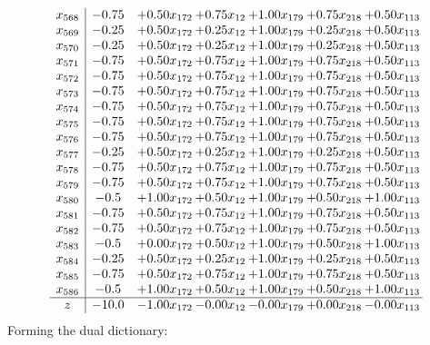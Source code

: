 \documentclass[8pt]{article}
\begin{document}
\[\begin{array}{c| c c@{\hskip 2pt} c@{\hskip 2pt} c@{\hskip 2pt} c@{\hskip 2pt} c@{\hskip 2pt} }
 x_{568}   &  -0.75 & +  0.50 x_{172} & +  0.75 x_{12} & +  1.00 x_{179} & +  0.75 x_{218} & +  0.50 x_{113}\\
 x_{569}   &  -0.25 & +  0.50 x_{172} & +  0.25 x_{12} & +  1.00 x_{179} & +  0.25 x_{218} & +  0.50 x_{113}\\
 x_{570}   &  -0.25 & +  0.50 x_{172} & +  0.25 x_{12} & +  1.00 x_{179} & +  0.25 x_{218} & +  0.50 x_{113}\\
 x_{571}   &  -0.75 & +  0.50 x_{172} & +  0.75 x_{12} & +  1.00 x_{179} & +  0.75 x_{218} & +  0.50 x_{113}\\
 x_{572}   &  -0.75 & +  0.50 x_{172} & +  0.75 x_{12} & +  1.00 x_{179} & +  0.75 x_{218} & +  0.50 x_{113}\\
 x_{573}   &  -0.75 & +  0.50 x_{172} & +  0.75 x_{12} & +  1.00 x_{179} & +  0.75 x_{218} & +  0.50 x_{113}\\
 x_{574}   &  -0.75 & +  0.50 x_{172} & +  0.75 x_{12} & +  1.00 x_{179} & +  0.75 x_{218} & +  0.50 x_{113}\\
 x_{575}   &  -0.75 & +  0.50 x_{172} & +  0.75 x_{12} & +  1.00 x_{179} & +  0.75 x_{218} & +  0.50 x_{113}\\
 x_{576}   &  -0.75 & +  0.50 x_{172} & +  0.75 x_{12} & +  1.00 x_{179} & +  0.75 x_{218} & +  0.50 x_{113}\\
 x_{577}   &  -0.25 & +  0.50 x_{172} & +  0.25 x_{12} & +  1.00 x_{179} & +  0.25 x_{218} & +  0.50 x_{113}\\
 x_{578}   &  -0.75 & +  0.50 x_{172} & +  0.75 x_{12} & +  1.00 x_{179} & +  0.75 x_{218} & +  0.50 x_{113}\\
 x_{579}   &  -0.75 & +  0.50 x_{172} & +  0.75 x_{12} & +  1.00 x_{179} & +  0.75 x_{218} & +  0.50 x_{113}\\
 x_{580}   &  -0.5 & +  1.00 x_{172} & +  0.50 x_{12} & +  1.00 x_{179} & +  0.50 x_{218} & +  1.00 x_{113}\\
 x_{581}   &  -0.75 & +  0.50 x_{172} & +  0.75 x_{12} & +  1.00 x_{179} & +  0.75 x_{218} & +  0.50 x_{113}\\
 x_{582}   &  -0.75 & +  0.50 x_{172} & +  0.75 x_{12} & +  1.00 x_{179} & +  0.75 x_{218} & +  0.50 x_{113}\\
 x_{583}   &  -0.5 & +  0.00 x_{172} & +  0.50 x_{12} & +  1.00 x_{179} & +  0.50 x_{218} & +  1.00 x_{113}\\
 x_{584}   &  -0.25 & +  0.50 x_{172} & +  0.25 x_{12} & +  1.00 x_{179} & +  0.25 x_{218} & +  0.50 x_{113}\\
 x_{585}   &  -0.75 & +  0.50 x_{172} & +  0.75 x_{12} & +  1.00 x_{179} & +  0.75 x_{218} & +  0.50 x_{113}\\
 x_{586}   &  -0.5 & +  1.00 x_{172} & +  0.50 x_{12} & +  1.00 x_{179} & +  0.50 x_{218} & +  1.00 x_{113}\\
\hline
z    &  -10.0 & -1.00 x_{172} & -0.00 x_{12} & -0.00 x_{179} & +  0.00 x_{218} & -0.00 x_{113}\\
\end{array}\]
Forming the dual dictionary:
\end{document}
